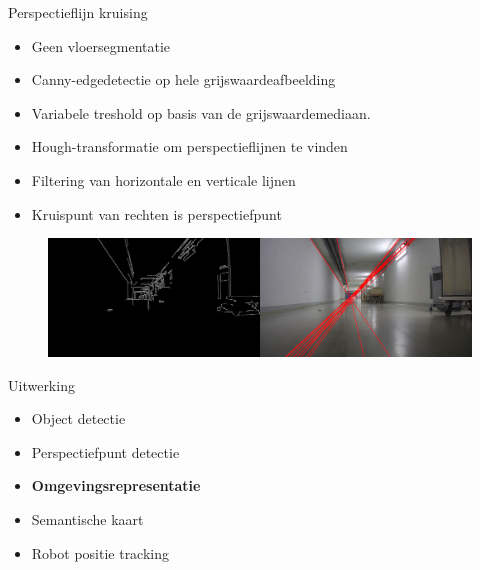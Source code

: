 \documentclass[11pt,t]{beamer}
\begin{document}
\begin{frame}[fragile]{Perspectieflijn kruising}
	\begin{itemize}
		\item Geen vloersegmentatie
		\item Canny-edgedetectie op hele grijswaardeafbeelding
		\item Variabele treshold op basis van de grijswaardemediaan. 
		\item Hough-transformatie om perspectieflijnen te vinden
		\item Filtering van horizontale en verticale lijnen
		\item Kruispunt van rechten is perspectiefpunt
	\end{itemize}

	\begin{figure}
		\centering
		\tiny
		\includegraphics[width=\textwidth]{graphics/hough_all.png}
	\end{figure}
\end{frame}

%
%

\begin{frame}[fragile]{Uitwerking}
	\begin{itemize}
		\item Object detectie
		\item Perspectiefpunt detectie
		\item \textbf{Omgevingsrepresentatie}
		\item Semantische kaart
		\item Robot positie tracking
	\end{itemize}
\end{frame}
\end{document}
